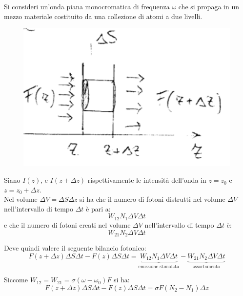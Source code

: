 Si consideri un'onda piana monocromatica di frequenza $\omega$ che si propaga in un mezzo materiale costituito da una collezione di atomi a due livelli.

\begin{figure}
    \centering
    \includegraphics[width=0.9\linewidth]{flux}
\end{figure}

Siano $I(z)$, e $I(z + \Delta z)$ rispettivamente le intensità dell'onda in $z = z_0$ e $z = z_0 + \Delta z$.\\
Nel volume $\Delta V = \Delta S \Delta z$ si ha che il numero di fotoni distrutti nel volume $\Delta V$ nell'intervallo di tempo $\Delta t$ è pari a:
\begin{equation*}
    W_{12} N_1 \Delta V \Delta t
\end{equation*}
e che il numero di fotoni creati nel volume $\Delta V$ nell'intervallo di tempo $\Delta t$ è:
\begin{equation*}
    W_{21} N_2 \Delta V \Delta t
\end{equation*}

Deve quindi valere il seguente bilancio fotonico:
\begin{equation*}
    F(z + \Delta z) \Delta S \Delta t - F(z) \Delta S \Delta t = \underbrace{W_{12} N_1 \Delta V \Delta t}_\text{emissione stimolata} - \underbrace{W_{21} N_2 \Delta V \Delta t}_\text{assorbimento}
\end{equation*}

Siccome $W_{12} = W_{21} = \sigma(\omega - \omega_0) F$ si ha:
\begin{equation*}
    F(z + \Delta z) \Delta S \Delta t - F(z) \Delta S \Delta t = \sigma F(N_2 - N_1) \Delta z
\end{equation*}

